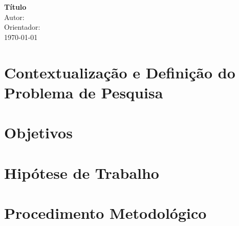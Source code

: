 \documentclass[12pt,a4paper, brazil]{article}
\begin{document}
\begin{center}
{\textbf {\huge Título}}\\[5mm]
{\large Autor: } \\[2mm]
{\large Orientador: } \\[5mm]
\today\\[5mm] %
\end{center}



\section{Contextualização e Definição do Problema de Pesquisa}

\cite{WinNT}

\cite{salahdine2019social}

\section{Objetivos}

\section{Hipótese de Trabalho}

\section{Procedimento Metodológico}

\printbibliography
\end{document}
